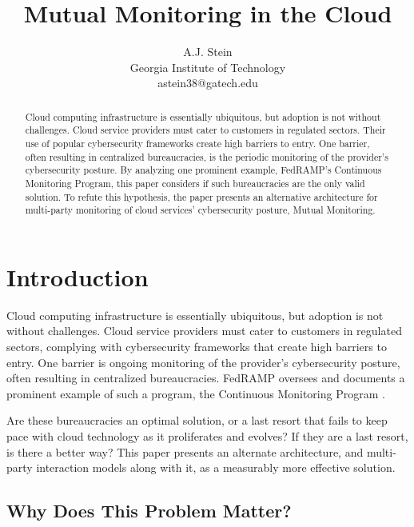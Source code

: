 \documentclass{jdf}
\begin{document}
\title{Mutual Monitoring in the Cloud}
\author{A.J. Stein \\ Georgia Institute of Technology \\ astein38@gatech.edu}

\maketitle
\thispagestyle{fancy}

\begin{abstract}
    Cloud computing infrastructure is essentially ubiquitous, but adoption is not without challenges. Cloud service providers must cater to customers in regulated sectors. Their use of popular cybersecurity frameworks create high barriers to entry. One barrier, often resulting in centralized bureaucracies, is the periodic monitoring of the provider's cybersecurity posture. By analyzing one prominent example, FedRAMP's Continuous Monitoring Program, this paper considers if such bureaucracies are the only valid solution. To refute this hypothesis, the paper presents an alternative architecture for multi-party monitoring of cloud services' cybersecurity posture, Mutual Monitoring.
\end{abstract}

\section{Introduction}

Cloud computing infrastructure is essentially ubiquitous, but adoption is not without challenges. Cloud service providers must cater to customers in regulated sectors, complying with cybersecurity frameworks that create high barriers to entry. One barrier is ongoing monitoring of the provider's cybersecurity posture, often resulting in centralized bureaucracies. FedRAMP oversees and documents a prominent example of such a program, the Continuous Monitoring Program \citeyear[p.~14]{fedramp_auth_playbook25}.

Are these bureaucracies an optimal solution, or a last resort that fails to keep pace with cloud technology as it proliferates and evolves? If they are a last resort, is there a better way? This paper presents an alternate architecture, and multi-party interaction models along with it, as a measurably more effective solution.

\subsection{Why Does This Problem Matter?}
\end{document}

